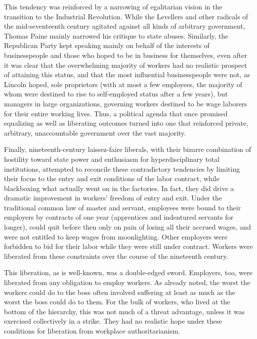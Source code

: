 \documentclass[
  letterpaper,
  11pt,
  DIV=9,
  openright]{scrbook}
\begin{document}
This tendency was reinforced by a narrowing of egalitarian vision in the
transition to the Industrial Revolution. While the Levellers and other
radicals of the mid-seventeenth century agitated against all kinds of
arbitrary government, Thomas Paine mainly narrowed his critique to state
abuses. Similarly, the Republican Party kept speaking mainly on behalf
of the interests of businesspeople and those who hoped to be in business
for themselves, even after it was clear that the overwhelming majority
of workers had no realistic prospect of attaining this status, and that
the most influential businesspeople were not, as Lincoln hoped, sole
proprietors (with at most a few employees, the majority of whom were
destined to rise to self-employed status after a few years), but
managers in large organizations, governing workers destined to be wage
laborers for their entire working lives. Thus, a political agenda that
once promised equalizing as well as liberating outcomes turned into one
that reinforced private, arbitrary, unaccountable government over the
vast majority.

Finally, nineteenth-century laissez-faire liberals, with their bizarre
combination of hostility toward state power and enthusiasm for
hyperdisciplinary total institutions, attempted to reconcile these
contradictory tendencies by limiting their focus to the entry and exit
conditions of the labor contract, while blackboxing what actually went
on in the factories. In fact, they did drive a dramatic improvement in
workers' freedom of entry and exit. Under the traditional common law of
master and servant, employees were bound to their employers by contracts
of one year (apprentices and indentured servants for longer), could quit
before then only on pain of losing all their accrued wages, and were not
entitled to keep wages from moonlighting. Other employers were forbidden
to bid for their labor while they were still under contract. Workers
were liberated from these constraints over the course of the nineteenth
century.

This liberation, as is well-known, was a double-edged sword. Employers,
too, were liberated from any obligation to employ workers. As already
noted, the worst the workers could do to the boss often involved
suffering at least as much as the worst the boss could do to them. For
the bulk of workers, who lived at the bottom of the hierarchy, this was
not much of a threat advantage, unless it was exercised collectively in
a strike. They had no realistic hope under these conditions for
liberation from workplace authoritarianism.
\end{document}
